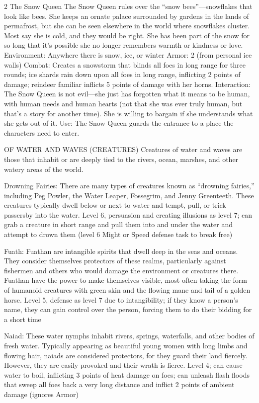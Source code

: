 \begin{multicols}{2}
The Snow Queen
The Snow Queen rules over the “snow bees”—snowflakes that look like bees. She keeps an ornate palace surrounded by gardens in the lands of permafrost, but she can be seen elsewhere in the world where snowflakes cluster. Most say she is cold, and they would be right. She has been part of the snow for so long that it’s possible she no longer remembers warmth or kindness or love.
Environment: Anywhere there is snow, ice, or winter
Armor: 2 (from personal ice walls)
Combat: Creates a snowstorm that blinds all foes in long range for three rounds; ice shards rain down upon all foes in long range, inflicting 2 points of damage; reindeer familiar inflicts 5 points of damage with her horns.
Interaction: The Snow Queen is not evil—she just has forgotten what it means to be human, with human needs and human hearts (not that she was ever truly human, but that’s a story for another time). She is willing to bargain if she understands what she gets out of it.
Use: The Snow Queen guards the entrance to a place the characters need to enter.

OF WATER AND WAVES (CREATURES)
Creatures of water and waves are those that inhabit or are deeply tied to the rivers, ocean, marshes, and other watery areas of the world.

Drowning Fairies: There are many types of creatures known as “drowning fairies,” including Peg Powler, the Water Leaper, Fossegrim, and Jenny Greenteeth. These creatures typically dwell below or next to water and tempt, pull, or trick passersby into the water.
Level 6, persuasion and creating illusions as level 7; can grab a creature in short range and pull them into and under the water and attempt to drown them (level 6 Might or Speed defense task to break free)

Fuath: Fuathan are intangible spirits that dwell deep in the seas and oceans. They consider themselves protectors of these realms, particularly against fishermen and others who would damage the environment or creatures there. Fuathan have the power to make themselves visible, most often taking the form of humanoid creatures with green skin and the flowing mane and tail of a golden horse.
	Level 5, defense as level 7 due to intangibility; if they know a person’s name, they can gain control over the person, forcing them to do their bidding for a short time

Naiad: These water nymphs inhabit rivers, springs, waterfalls, and other bodies of fresh water. Typically appearing as beautiful young women with long limbs and flowing hair, naiads are considered protectors, for they guard their land fiercely. However, they are easily provoked and their wrath is fierce.
Level 4; can cause water to boil, inflicting 3 points of heat damage on foes; can unleash flash floods that sweep all foes back a very long distance and inflict 2 points of ambient damage (ignores Armor)


\end{multicols}
